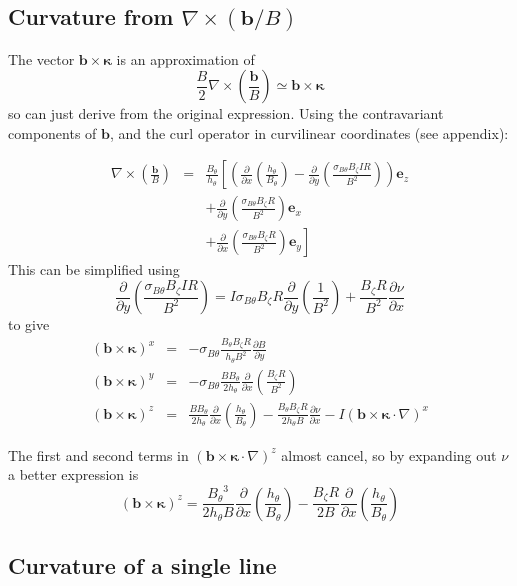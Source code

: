 \documentclass[12pt]{article}
\newcommand{\sbt}{\ensuremath{\sigma_{B\theta}}}
\newcommand{\deriv}[2]{\ensuremath{\frac{\partial #1}{\partial #2}}}
\newcommand{\hthe}{\ensuremath{h_\theta}}
\newcommand{\Bp}{\ensuremath{B_\theta}}
\newcommand{\Bt}{\ensuremath{B_\zeta}}
\newcommand{\Vec}[1]{\ensuremath{\mathbf{#1}}}
\newcommand{\bvec}{\Vec{b}}
\newcommand{\kvec}{\Vec{\kappa}}
\newcommand{\bxk}{\bvec\times\kvec\cdot\nabla}
\begin{document}
\subsection{Curvature from $\nabla\times\left(\bvec / B\right)$}

The vector $\bvec\times\kvec$ is an approximation of
\[
\frac{B}{2}\nabla\times\left(\frac{\bvec}{B}\right) \simeq \bvec\times\kvec
\]
so can just derive from the original expression. Using the contravariant components of
$\bvec$, and the curl operator in curvilinear coordinates (see appendix):

\begin{eqnarray*}
\nabla\times\left(\frac{\bvec}{B}\right) &=& \frac{\Bp}{\hthe}\left[\left(\deriv{}{x}\left(\frac{\hthe}{\Bp}\right) - \deriv{}{y}\left(\frac{\sbt\Bt IR}{B^2}\right)\right)\Vec{e}_z \right. \\
&& + \deriv{}{y}\left(\frac{\sbt\Bt R}{B^2}\right)\Vec{e}_x \\
&& + \left.\deriv{}{x}\left(\frac{\sbt\Bt R}{B^2}\right)\Vec{e}_y\right]
\end{eqnarray*}
This can be simplified using
\[
\deriv{}{y}\left(\frac{\sbt\Bt IR}{B^2}\right) = I\sbt\Bt R\deriv{}{y}\left(\frac{1}{B^2}\right) + \frac{\Bt R}{B^2}\deriv{\nu}{x}
\]
to give
\begin{eqnarray*}
  \left(\bvec\times\kvec\right)^x &=& -\sbt\frac{\Bp\Bt R}{\hthe B^2}\deriv{B}{y} \\
  \left(\bvec\times\kvec\right)^y &=& -\sbt\frac{B\Bp}{2\hthe}\deriv{}{x}\left(\frac{\Bt R}{B^2}\right) \\
  \left(\bvec\times\kvec\right)^z &=& \frac{B\Bp}{2\hthe}\deriv{}{x}\left(\frac{\hthe}{\Bp}\right) - \frac{\Bp\Bt R}{2\hthe B}\deriv{\nu}{x} - I\left(\bxk\right)^x
\end{eqnarray*}

The first and second terms in $\left(\bxk\right)^z$ almost cancel, so by expanding out $\nu$ a better expression is
\[
\left(\bvec\times\kvec\right)^z = \frac{\Bp^3}{2\hthe B}\deriv{}{x}\left(\frac{\hthe}{\Bp}\right) - \frac{\Bt R}{2B}\deriv{}{x}\left(\frac{\hthe}{\Bp}\right)
\]

\subsection{Curvature of a single line}
\end{document}
